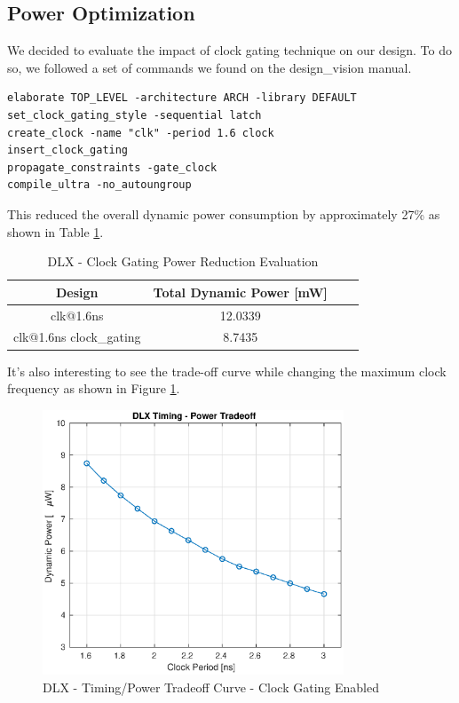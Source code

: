 \documentclass[12pt]{article}
\begin{document}
\subsection{Power Optimization}
We decided to evaluate the impact of clock gating technique on our design. To do so, we followed a set of commands we found on the design\_vision manual.
\begin{minipage}{\linewidth}
\begin{lstlisting}
elaborate TOP_LEVEL -architecture ARCH -library DEFAULT
set_clock_gating_style -sequential latch
create_clock -name "clk" -period 1.6 clock
insert_clock_gating
propagate_constraints -gate_clock
compile_ultra -no_autoungroup
\end{lstlisting}
\end{minipage}


This reduced the overall dynamic power consumption by approximately 27\% as shown in Table \ref{POWERTABLE}.

	
\begin{table}[h]
	\begin{center}
	\begin{tabular}{ | c | c | c | c |}
		\hline
		\rowcolor{LimeGreen}Design &Total Dynamic Power [mW]\\ \hline
		clk@1.6ns & 12.0339 \\ \hline
		clk@1.6ns clock\_gating & 8.7435 \\ \hline
	\end{tabular}
		\caption{DLX - Clock Gating Power Reduction Evaluation}
		\label{POWERTABLE}
	\end{center}
\end{table}


It's also interesting to see the trade-off curve while changing the maximum clock frequency as shown in Figure \ref{PPA}.
\begin{figure}[!ht]
	\includegraphics[width=0.8\textwidth, center]{images/PPA.eps}
	\caption{DLX - Timing/Power Tradeoff Curve - Clock Gating Enabled}
	\label{PPA}
\end{figure}
\end{document}
